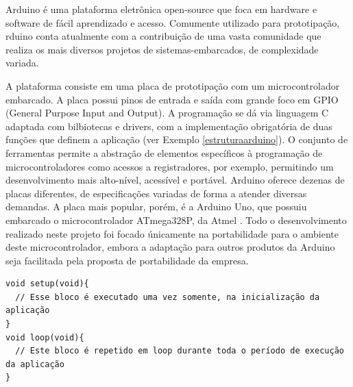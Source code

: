 \documentclass{article}
\begin{document}
\tab Arduino é uma plataforma eletrônica open-source que foca em hardware e software de fácil aprendizado e acesso. Comumente utilizado para prototipação, rduino conta atualmente com a contribuição de uma vasta comunidade que realiza os mais diversos projetos de sistemas-embarcados, de complexidade variada. \cite{arduinoblog}
\par A plataforma consiste em uma placa de prototipação com um microcontrolador embarcado. A placa possui pinos de entrada e saída com grande foco em GPIO (General Purpose Input and Output). A programação se dá via linguagem C adaptada com bilbiotecas e drivers, com a implementação obrigatória de duas funções que definem a aplicação (ver Exemplo \ref{estruturaarduino}). O conjunto de ferramentas permite a abstração de elementos específicos à programação de microcontroladores como acessos a registradores, por exemplo, permitindo um desenvolvimento mais alto-nível, acessível e portável. Arduino oferece dezenas de placas diferentes, de especificações variadas de forma a atender diversas demandas. A placa mais popular, porém, é a Arduino Uno, que possuiu embarcado o microcontrolador ATmega328P, da Atmel \cite{atmegadatasheet}. Todo o desenvolvimento realizado neste projeto foi focado únicamente na portabilidade para o ambiente deste microcontrolador, embora a adaptação para outros produtos da Arduino seja facilitada pela proposta de portabilidade da empresa.
\begin{lstlisting}[style=CStyle,label=estruturaarduino,caption=Estrutura de uma aplicação Arduino]
void setup(void){
  // Esse bloco é executado uma vez somente, na inicialização da aplicação
}
void loop(void){
  // Este bloco é repetido em loop durante toda o período de execução da aplicação
}
\end{lstlisting}
\end{document}
